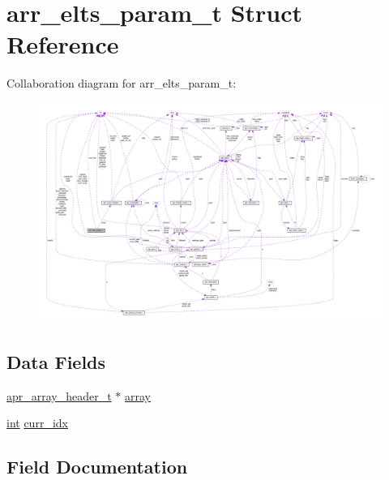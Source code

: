 \hypertarget{structarr__elts__param__t}{}\section{arr\+\_\+elts\+\_\+param\+\_\+t Struct Reference}
\label{structarr__elts__param__t}


Collaboration diagram for arr\+\_\+elts\+\_\+param\+\_\+t\+:
\nopagebreak
\begin{figure}[H]
\begin{center}
\leavevmode
\includegraphics[width=350pt]{structarr__elts__param__t__coll__graph}
\end{center}
\end{figure}
\subsection*{Data Fields}
\begin{DoxyCompactItemize}
\item 
\hyperlink{structapr__array__header__t}{apr\+\_\+array\+\_\+header\+\_\+t} $\ast$ \hyperlink{structarr__elts__param__t_acb3c71b68221be40f2e544dad3998d4a}{array}
\item 
\hyperlink{pcre_8txt_a42dfa4ff673c82d8efe7144098fbc198}{int} \hyperlink{structarr__elts__param__t_acc524b7d0b8a67097cf142acb9aceca3}{curr\+\_\+idx}
\end{DoxyCompactItemize}


\subsection{Field Documentation}
